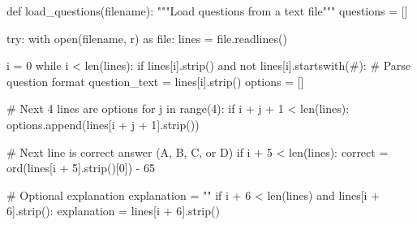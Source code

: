 \documentclass[
  letterpaper,
  DIV=11,
  numbers=noendperiod,
  oneside]{scrreprt}
\newenvironment{Shaded}{}{}
\newcommand{\BuiltInTok}[1]{\textcolor[rgb]{0.84,0.23,0.29}{#1}}
\newcommand{\CommentTok}[1]{\textcolor[rgb]{0.42,0.45,0.49}{#1}}
\newcommand{\ControlFlowTok}[1]{\textcolor[rgb]{0.84,0.23,0.29}{#1}}
\newcommand{\DecValTok}[1]{\textcolor[rgb]{0.00,0.36,0.77}{#1}}
\newcommand{\ImportTok}[1]{\textcolor[rgb]{0.01,0.18,0.38}{#1}}
\newcommand{\KeywordTok}[1]{\textcolor[rgb]{0.84,0.23,0.29}{#1}}
\newcommand{\NormalTok}[1]{\textcolor[rgb]{0.14,0.16,0.18}{#1}}
\newcommand{\OperatorTok}[1]{\textcolor[rgb]{0.14,0.16,0.18}{#1}}
\newcommand{\StringTok}[1]{\textcolor[rgb]{0.01,0.18,0.38}{#1}}
\begin{document}
\begin{Shaded}
\begin{Highlighting}[]
\KeywordTok{def}\NormalTok{ load\_questions(filename):}
    \CommentTok{"""Load questions from a text file"""}
\NormalTok{    questions }\OperatorTok{=}\NormalTok{ []}
    
    \ControlFlowTok{try}\NormalTok{:}
        \ControlFlowTok{with} \BuiltInTok{open}\NormalTok{(filename, }\StringTok{\textquotesingle{}r\textquotesingle{}}\NormalTok{) }\ImportTok{as} \BuiltInTok{file}\NormalTok{:}
\NormalTok{            lines }\OperatorTok{=} \BuiltInTok{file}\NormalTok{.readlines()}
            
\NormalTok{        i }\OperatorTok{=} \DecValTok{0}
        \ControlFlowTok{while}\NormalTok{ i }\OperatorTok{\textless{}} \BuiltInTok{len}\NormalTok{(lines):}
            \ControlFlowTok{if}\NormalTok{ lines[i].strip() }\KeywordTok{and} \KeywordTok{not}\NormalTok{ lines[i].startswith(}\StringTok{\textquotesingle{}\#\textquotesingle{}}\NormalTok{):}
                \CommentTok{\# Parse question format}
\NormalTok{                question\_text }\OperatorTok{=}\NormalTok{ lines[i].strip()}
\NormalTok{                options }\OperatorTok{=}\NormalTok{ []}
                
                \CommentTok{\# Next 4 lines are options}
                \ControlFlowTok{for}\NormalTok{ j }\KeywordTok{in} \BuiltInTok{range}\NormalTok{(}\DecValTok{4}\NormalTok{):}
                    \ControlFlowTok{if}\NormalTok{ i }\OperatorTok{+}\NormalTok{ j }\OperatorTok{+} \DecValTok{1} \OperatorTok{\textless{}} \BuiltInTok{len}\NormalTok{(lines):}
\NormalTok{                        options.append(lines[i }\OperatorTok{+}\NormalTok{ j }\OperatorTok{+} \DecValTok{1}\NormalTok{].strip())}
                
                \CommentTok{\# Next line is correct answer (A, B, C, or D)}
                \ControlFlowTok{if}\NormalTok{ i }\OperatorTok{+} \DecValTok{5} \OperatorTok{\textless{}} \BuiltInTok{len}\NormalTok{(lines):}
\NormalTok{                    correct }\OperatorTok{=} \BuiltInTok{ord}\NormalTok{(lines[i }\OperatorTok{+} \DecValTok{5}\NormalTok{].strip()[}\DecValTok{0}\NormalTok{]) }\OperatorTok{{-}} \DecValTok{65}
                
                \CommentTok{\# Optional explanation}
\NormalTok{                explanation }\OperatorTok{=} \StringTok{""}
                \ControlFlowTok{if}\NormalTok{ i }\OperatorTok{+} \DecValTok{6} \OperatorTok{\textless{}} \BuiltInTok{len}\NormalTok{(lines) }\KeywordTok{and}\NormalTok{ lines[i }\OperatorTok{+} \DecValTok{6}\NormalTok{].strip():}
\NormalTok{                    explanation }\OperatorTok{=}\NormalTok{ lines[i }\OperatorTok{+} \DecValTok{6}\NormalTok{].strip()}
                

\end{Highlighting}
\end{Shaded}
\end{document}
